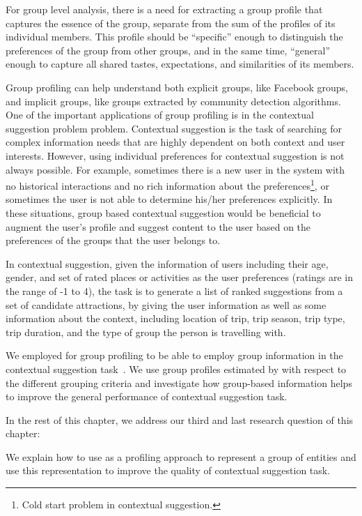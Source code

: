 For group level analysis, there is a need for extracting a group profile that captures the essence of the group, separate from the sum of the profiles of its individual members. This profile should be ``specific'' enough to distinguish the preferences of the group from other groups, and in the same time, ``general'' enough to capture all shared tastes, expectations, and similarities of its members. 

Group profiling can help understand both explicit groups, like Facebook groups, and implicit groups, like groups extracted by community detection algorithms. One of the important applications of group profiling is in the contextual suggestion problem problem.  
Contextual suggestion is the task of searching for complex information needs that are highly dependent on both context and user interests. However, using individual preferences for contextual suggestion is not always possible. 
For example, sometimes there is a new user in the system with no historical interactions and no rich information about the preferences\footnote{Cold start problem in contextual suggestion.}, or sometimes the user is not able to determine his/her preferences explicitly. In these situations, group based contextual suggestion would be beneficial to augment the user's profile and suggest content to the user based on the preferences of the groups that the user belongs to. 

In contextual suggestion, given the information of users including their age, gender, and set of rated places or activities as the user preferences (ratings are in the range of -1 to 4), the task is to generate a list of ranked suggestions from a set of candidate attractions, by giving the user information as well as some information about the context, including location of trip, trip season, trip type, trip duration, and the type of group the person is travelling with.

We employed \acswlm for group profiling to be able to employ group information in the contextual suggestion task~\citep{Dehghani2016:trec,Dehghani:2016:CHIIR,Hashemi:2015}. We use group profiles estimated by \acswlm with respect to the different grouping criteria and investigate how group-based information helps to improve the general performance of contextual suggestion task. 

In the rest of this chapter, we address our third and last research question of this chapter: 

We explain how to use \acswlm as a profiling approach to represent a group of entities and use this representation to improve the quality of contextual suggestion task.

